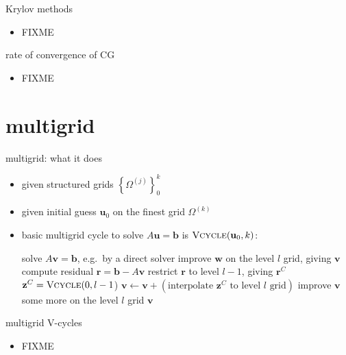 \documentclass[hide notes,intlimits,usenames,dvipsnames]{beamer}
\newcommand{\bb}{\mathbf{b}}
\newcommand{\br}{\mathbf{r}}
\newcommand{\bu}{\mathbf{u}}
\newcommand{\bv}{\mathbf{v}}
\newcommand{\bw}{\mathbf{w}}
\newcommand{\bz}{\mathbf{z}}
\begin{document}
\begin{frame}{Krylov methods}
\begin{itemize}
\item FIXME
\end{itemize}
\end{frame}

\begin{frame}{rate of convergence of CG}
\begin{itemize}
\item FIXME
\end{itemize}
\end{frame}


\section{multigrid}

\begin{frame}{multigrid: what it does}

\small
\begin{itemize}
\item given structured grids $\left\{\Omega^{(j)}\right\}_0^k$
\item given initial guess $\bu_0$ on the finest grid $\Omega^{(k)}$
\item basic multigrid cycle to solve $A \bu = \bb$ is $\text{\textsc{Vcycle}}(\bu_0,k)$:

\medskip
\begin{algorithmic}
\footnotesize
\Function{Vcycle}{$\bw,l$}
        \State solve $A \bv = \bb$, e.g.~by a direct solver
    \Else
        \State improve $\bw$ on the level $l$ grid, giving $\bv$
        \State compute residual $\br = \bb - A \bv$
        \State restrict $\br$ to level $l-1$, giving $\br^C$
        \State $\bz^C = \text{\textsc{Vcycle}}(0,l-1$)
        \State $\bv \gets \bv + (\text{interpolate } \bz^C \text{ to level $l$ grid})$
        \State improve $\bv$ some more on the level $l$ grid
        \EndIf
    \Return $\bv$
\EndFunction
\end{algorithmic}
\end{itemize}
\end{frame}


\begin{frame}{multigrid V-cycles}

\begin{itemize}
\item FIXME
\end{itemize}




\medskip
\qquad 
\end{frame}
\end{document}
